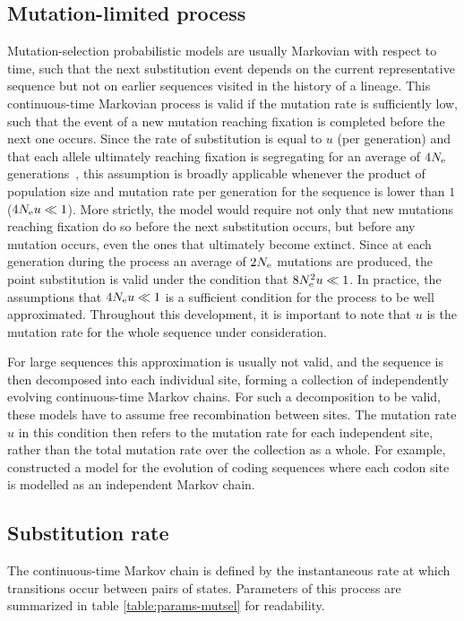 \subsection{Mutation-limited process}
\label{subsec:mutation-limited-assumption}

Mutation-selection probabilistic models are usually Markovian with respect to time, such that the next substitution event depends on the current representative sequence but not on earlier sequences visited in the history of a lineage.
This continuous-time Markovian process is valid if the mutation rate is sufficiently low, such that the event of a new mutation reaching fixation is completed before the next one occurs.
Since the rate of substitution is equal to $u$ (per generation) and that each allele ultimately reaching fixation is segregating for an average of $4 N_{\textrm{e}}$ generations~\citep{Kimura1969}, this assumption is broadly applicable whenever the product of population size and mutation rate per generation for the sequence is lower than $1$ ($4 N_{\textrm{e}} u \ll 1$).
More strictly, the model would require not only that new mutations reaching fixation do so before the next substitution occurs, but before any mutation occurs, even the ones that ultimately become extinct.
Since at each generation during the process an average of $2N_{\textrm{e}}$ mutations are produced, the point substitution is valid under the condition that $8N_{\textrm{e}}^2 u \ll 1$.
In practice, the assumptions that $4 N_{\textrm{e}} u \ll 1$ is a sufficient condition for the process to be well approximated.
Throughout this development, it is important to note that $u$ is the mutation rate for the whole sequence under consideration.

For large sequences this approximation is usually not valid, and the sequence is then decomposed into each individual site, forming a collection of independently evolving continuous-time Markov chains.
For such a decomposition to be valid, these models have to assume free recombination between sites.
The mutation rate $u$ in this condition then refers to the mutation rate for each independent site, rather than the total mutation rate over the collection as a whole.
For example, \citet{Halpern1998} constructed a model for the evolution of coding sequences where each codon site is modelled as an independent Markov chain.


\subsection{Substitution rate}
The continuous-time Markov chain is defined by the instantaneous rate at which transitions occur between pairs of states.
Parameters of this process are summarized in table \ref{table:params-mutsel} for readability.

